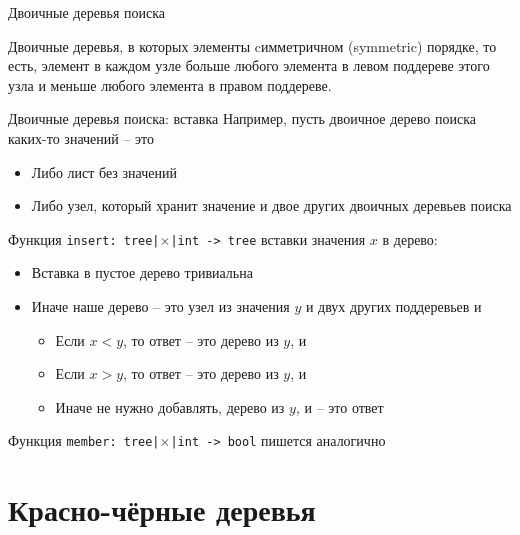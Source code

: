 \begin{frame}{Двоичные деревья поиска}
\begin{definition}
Двоичные деревья, в которых элементы cимметричном
 (symmetric) порядке, то есть, элемент в каждом узле больше любого элемента в левом поддереве
этого узла и меньше любого элемента в правом поддереве. 
\end{definition}
\end{frame}

\begin{frame}{Двоичные деревья поиска: вставка}
Например, пусть двоичное дерево поиска каких-то значений -- это 
\begin{itemize}
\item Либо лист без значений
\item Либо узел, который хранит значение и двое других двоичных деревьев поиска
\end{itemize}
\vspace{1em}

Функция \texttt{insert: tree|$\times$|int -> tree} вставки значения $x$ в дерево:
\begin{itemize}
\item Вставка в пустое дерево тривиальна
\item Иначе наше дерево -- это узел из значения $y$ и двух других поддеревьев  и 
\begin{itemize}
\item Если $x<y$, то ответ -- это дерево из $y$,  и 
\item Если $x>y$, то ответ -- это дерево из $y$,  и  
\item Иначе не нужно добавлять, дерево из $y$,  и  -- это ответ
\end{itemize}
\end{itemize}
\vspace{2em}
Функция \texttt{member: tree|$\times$|int -> bool} пишется аналогично
\end{frame}

%






\section{Красно-чёрные деревья}

